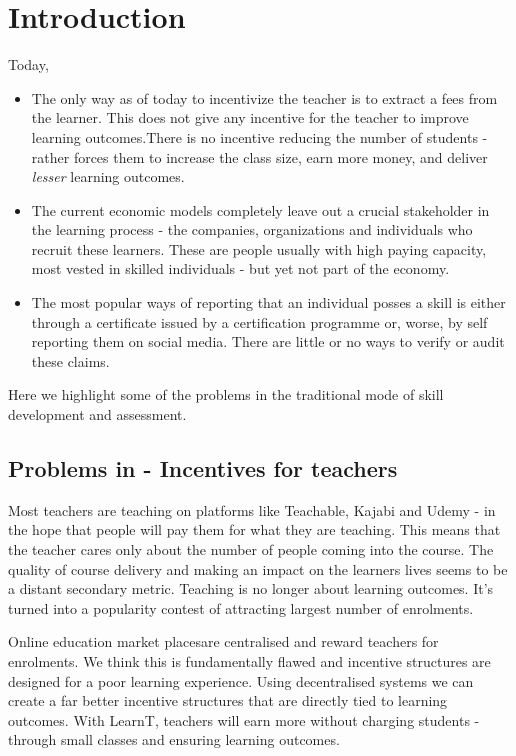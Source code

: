 \documentclass{article}
\begin{document}
  \section{Introduction}
    Today,
    \begin{itemize}
      \item The only way as of today to incentivize the teacher is to extract a fees from the learner. This does not give any incentive for the teacher to improve learning outcomes.There is no incentive reducing the number of students - rather forces them to increase the class size, earn more money, and deliver \textit{lesser} learning outcomes.
      \item The current economic models completely leave out a crucial stakeholder in the learning process - the companies, organizations and individuals who recruit these learners. These are people usually with high paying capacity, most vested in skilled individuals - but yet not part of the economy.
      \item The most popular ways of reporting that an individual posses a skill is either through a certificate issued by a certification programme or, worse, by self reporting them on social media. There are little or no ways to verify or audit these claims.
    \end{itemize}
    Here we highlight some of the problems in the traditional mode of skill development and assessment. 
    \subsection{Problems in - Incentives for teachers}
      Most teachers are teaching on platforms like Teachable, Kajabi and Udemy - in the hope that people will pay them for what they are teaching. 
      This means that the teacher cares only about the number of people coming into the course. The quality of course delivery and making an impact on the learners lives seems to be a distant secondary metric. Teaching is no longer about learning outcomes. It's turned into a popularity contest of attracting largest number of enrolments. 
      \par
       Online education market placesare centralised and reward teachers for enrolments. We think this is fundamentally flawed and incentive structures are designed for a poor learning experience. 
       Using decentralised systems we can create a far better incentive structures that are directly tied to learning outcomes. 
       With LearnT, teachers will earn more without charging students - through small classes and ensuring learning outcomes.
       
\end{document}
